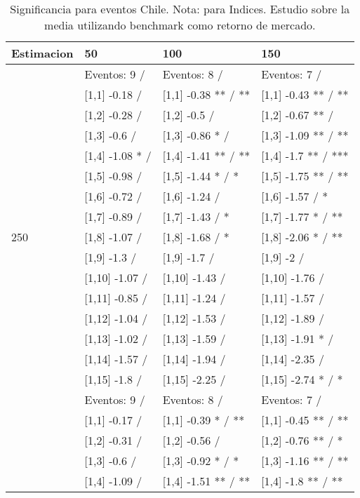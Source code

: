 \begin{table}

\caption{Significancia para eventos Chile. Nota: para Indices. Estudio sobre la media utilizando benchmark como retorno de mercado.}
\centering
\begin{tabular}[t]{llll}
\toprule
Estimacion & 50 & 100 & 150\\
\midrule
 & Eventos:  9 / & Eventos:  8 / & Eventos:  7 /\\
 & {}[1,1] -0.18  / & {}[1,1] -0.38 ** / ** & {}[1,1] -0.43 ** / **\\
 & {}[1,2] -0.28  / & {}[1,2] -0.5  / & {}[1,2] -0.67 ** /\\
 & {}[1,3] -0.6  / & {}[1,3] -0.86 * / & {}[1,3] -1.09 ** / **\\
 & {}[1,4] -1.08 * / & {}[1,4] -1.41 ** / ** & {}[1,4] -1.7 ** / ***\\
\addlinespace
 & {}[1,5] -0.98  / & {}[1,5] -1.44 * / * & {}[1,5] -1.75 ** / **\\
 & {}[1,6] -0.72  / & {}[1,6] -1.24  / & {}[1,6] -1.57  / *\\
 & {}[1,7] -0.89  / & {}[1,7] -1.43  / * & {}[1,7] -1.77 * / **\\
250 & {}[1,8] -1.07  / & {}[1,8] -1.68  / * & {}[1,8] -2.06 * / **\\
 & {}[1,9] -1.3  / & {}[1,9] -1.7  / & {}[1,9] -2  /\\
\addlinespace
 & {}[1,10] -1.07  / & {}[1,10] -1.43  / & {}[1,10] -1.76  /\\
 & {}[1,11] -0.85  / & {}[1,11] -1.24  / & {}[1,11] -1.57  /\\
 & {}[1,12] -1.04  / & {}[1,12] -1.53  / & {}[1,12] -1.89  /\\
 & {}[1,13] -1.02  / & {}[1,13] -1.59  / & {}[1,13] -1.91 * /\\
 & {}[1,14] -1.57  / & {}[1,14] -1.94  / & {}[1,14] -2.35  /\\
\addlinespace
 & {}[1,15] -1.8  / & {}[1,15] -2.25  / & {}[1,15] -2.74 * / *\\
 & Eventos:  9 / & Eventos:  8 / & Eventos:  7 /\\
 & {}[1,1] -0.17  / & {}[1,1] -0.39 * / ** & {}[1,1] -0.45 ** / **\\
 & {}[1,2] -0.31  / & {}[1,2] -0.56  / & {}[1,2] -0.76 ** / *\\
 & {}[1,3] -0.6  / & {}[1,3] -0.92 * / * & {}[1,3] -1.16 ** / **\\
\addlinespace
 & {}[1,4] -1.09  / & {}[1,4] -1.51 ** / ** & {}[1,4] -1.8 ** / **\\

\end{tabular}
\end{table}
